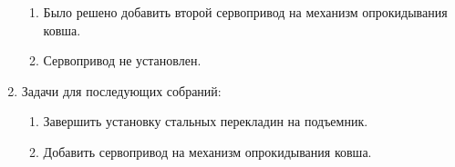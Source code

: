 \begin{enumerate}
\begin{enumerate}
	  \item Было решено добавить второй сервопривод на механизм опрокидывания ковша.
	  
	  \item Сервопривод не установлен.
	  
    \end{enumerate}
    
	\item Задачи для последующих собраний:
	\begin{enumerate}
	  \item Завершить установку стальных перекладин на подъемник.
	  
	  \item Добавить сервопривод на механизм опрокидывания ковша.
	  
    \end{enumerate}     
\end{enumerate}
\fillpage